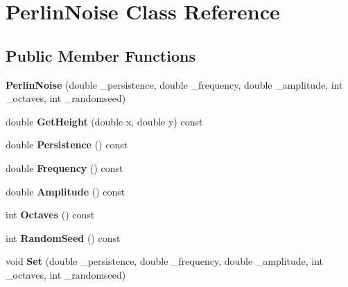 \hypertarget{classPerlinNoise}{}\section{Perlin\+Noise Class Reference}
\label{classPerlinNoise}
\subsection*{Public Member Functions}
\begin{DoxyCompactItemize}
\item 
{\bfseries Perlin\+Noise} (double \+\_\+persistence, double \+\_\+frequency, double \+\_\+amplitude, int \+\_\+octaves, int \+\_\+randomseed)\hypertarget{classPerlinNoise_a3926062e9211b00fedd72b1b5d02a537}{}\label{classPerlinNoise_a3926062e9211b00fedd72b1b5d02a537}

\item 
double {\bfseries Get\+Height} (double x, double y) const \hypertarget{classPerlinNoise_a42bab5abb182be779578df722b32ee68}{}\label{classPerlinNoise_a42bab5abb182be779578df722b32ee68}

\item 
double {\bfseries Persistence} () const \hypertarget{classPerlinNoise_ad0a82f6c8cd0b0b7a4d6d90bd1279fe8}{}\label{classPerlinNoise_ad0a82f6c8cd0b0b7a4d6d90bd1279fe8}

\item 
double {\bfseries Frequency} () const \hypertarget{classPerlinNoise_add09140662f5fadc3f1e0eec512a18d0}{}\label{classPerlinNoise_add09140662f5fadc3f1e0eec512a18d0}

\item 
double {\bfseries Amplitude} () const \hypertarget{classPerlinNoise_a8f642423552f6a561e31f1a7053eb6bb}{}\label{classPerlinNoise_a8f642423552f6a561e31f1a7053eb6bb}

\item 
int {\bfseries Octaves} () const \hypertarget{classPerlinNoise_a099788d1c748e7704f21ffcfd004698d}{}\label{classPerlinNoise_a099788d1c748e7704f21ffcfd004698d}

\item 
int {\bfseries Random\+Seed} () const \hypertarget{classPerlinNoise_a43b043813ffb2e9546660bc21fa054cd}{}\label{classPerlinNoise_a43b043813ffb2e9546660bc21fa054cd}

\item 
void {\bfseries Set} (double \+\_\+persistence, double \+\_\+frequency, double \+\_\+amplitude, int \+\_\+octaves, int \+\_\+randomseed)\hypertarget{classPerlinNoise_a8abb59af3f09c7109b43b208eb4a33c4}{}\label{classPerlinNoise_a8abb59af3f09c7109b43b208eb4a33c4}


\end{DoxyCompactItemize}
